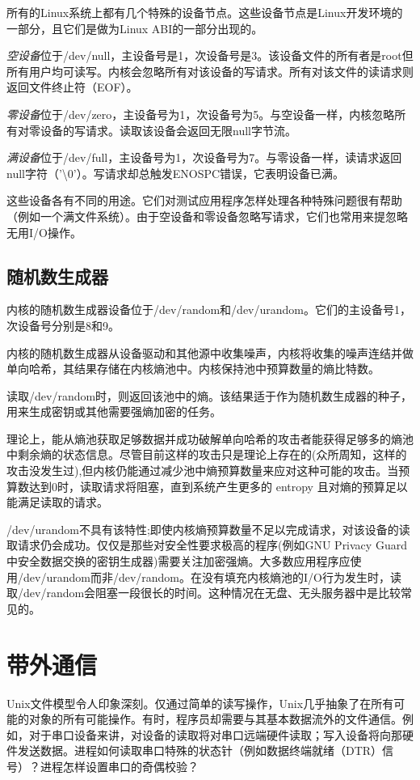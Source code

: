 所有的Linux系统上都有几个特殊的设备节点。这些设备节点是Linux开发环境的一部分，且它们是做为Linux ABI的一部分出现的。

\emph{空设备}位于/dev/null，主设备号是1，次设备号是3。该设备文件的所有者是root但所有用户均可读写。内核会忽略所有对该设备的写请求。所有对该文件的读请求则返回文件终止符（EOF）。

\emph{零设备}位于/dev/zero，主设备号为1，次设备号为5。与空设备一样，内核忽略所有对零设备的写请求。读取该设备会返回无限null字节流。

\emph{满设备}位于/dev/full，主设备号为1，次设备号为7。与零设备一样，读请求返回null字符（'\textbackslash0'）。写请求却总触发ENOSPC错误，它表明设备已满。

这些设备各有不同的用途。它们对测试应用程序怎样处理各种特殊问题很有帮助（例如一个满文件系统）。由于空设备和零设备忽略写请求，它们也常用来提忽略无用I/O操作。

\subsection{随机数生成器} 

内核的随机数生成器设备位于/dev/random和/dev/urandom。它们的主设备号1，次设备号分别是8和9。

内核的随机数生成器从设备驱动和其他源中收集噪声，内核将收集的噪声连结并做单向哈希，其结果存储在内核熵池中。内核保持池中预算数量的熵比特数。

读取/dev/random时，则返回该池中的熵。该结果适于作为随机数生成器的种子，用来生成密钥或其他需要强熵加密的任务。

理论上，能从熵池获取足够数据并成功破解单向哈希的攻击者能获得足够多的熵池中剩余熵的状态信息。尽管目前这样的攻击只是理论上存在的(众所周知，这样的攻击没发生过),但内核仍能通过减少池中熵预算数量来应对这种可能的攻击。当预算数达到0时，读取请求将阻塞，直到系统产生更多的 entropy 且对熵的预算足以能满足读取的请求。

/dev/urandom不具有该特性;即使内核熵预算数量不足以完成请求，对该设备的读取请求仍会成功。仅仅是那些对安全性要求极高的程序(例如GNU Privacy Guard中安全数据交换的密钥生成器)需要关注加密强熵。大多数应用程序应使用/dev/urandom而非/dev/random。在没有填充内核熵池的I/O行为发生时，读取/dev/random会阻塞一段很长的时间。这种情况在无盘、无头服务器中是比较常见的。

\section{带外通信}

Unix文件模型令人印象深刻。仅通过简单的读写操作，Unix几乎抽象了在所有可能的对象的所有可能操作。有时，程序员却需要与其基本数据流外的文件通信。例如，对于串口设备来讲，对设备的读取将对串口远端硬件读取；写入设备将向那硬件发送数据。进程如何读取串口特殊的状态针（例如数据终端就绪（DTR）信号）？进程怎样设置串口的奇偶校验？

